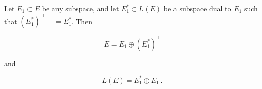 Let $E_1 \subset E$ be any subspace, and let $E_1^* \subset L(E)$ be a subspace dual to $E_1$ such that $(E_1^*)^{\perp\perp} = E_1^*$. Then

$$E = E_1 \oplus (E_1^*)^\perp$$

and

$$L(E) = E_1^* \oplus E_1^\perp.$$
